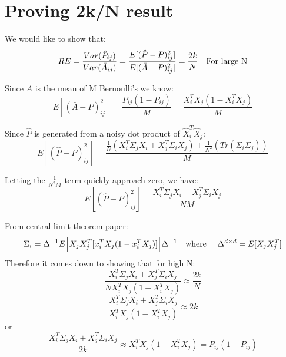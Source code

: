 \documentclass[10pt]{article}
\begin{document}
\section{Proving 2k/N result}
We would like to show that:
\begin{equation*}
 RE = \dfrac{Var(\hat{P}_{ij})}{Var(\bar{A}_{ij})} = \dfrac{E[(\hat{P}-P)^2_{ij}]}{E[(\bar{A}-P)^2_{ij}]}=\dfrac{2k}{N} \mbox{\quad   For large N}
\end{equation*}

Since $\bar{A}$ is the mean of M Bernoulli's we know:
\[
E[(\bar{A}-P)^2_{ij}] = \frac{P_{ij}(1-P_{ij})}{M} = \dfrac{X_i^TX_j(1-X_i^TX_j)}{M}
\]

Since $\hat{P}$ is generated from a noisy dot product of $\hat{X}_i^T\hat{X}_j$:
\[
E[(\hat{P}-P)^2_{ij}] = \dfrac{\frac{1}{N}(X_i^T\Sigma_jX_i + X_j^T\Sigma_iX_j) + \frac{1}{N^2}(Tr(\Sigma_i\Sigma_j))}{M}
\]

Letting the $\frac{1}{N^2M}$ term quickly approach zero, we have:
\[
E[(\hat{P}-P)^2_{ij}] = \dfrac{X_i^T\Sigma_jX_i + X_j^T\Sigma_iX_j}{NM}
\]

From central limit theorem paper:
\[
\Sigma_i = \Delta^{-1}E\Big[X_jX_j^T[x_i^TX_j(1-x_i^TX_j)]\Big]\Delta^{-1} \mbox{\quad where \quad} \Delta^{d \times d} = E[X_jX_j^T]
\]
Therefore it comes down to showing that for high N:
\[
\dfrac{X_i^T\Sigma_jX_i + X_j^T\Sigma_iX_j}{NX_i^TX_j(1-X_i^TX_j)} \approx \dfrac{2k}{N}
\]
\[
\dfrac{X_i^T\Sigma_jX_i + X_j^T\Sigma_iX_j}{X_i^TX_j(1-X_i^TX_j)} \approx 2k
\]
or 
\[
\dfrac{X_i^T\Sigma_jX_i + X_j^T\Sigma_iX_j}{2k} \approx X_i^TX_j(1-X_i^TX_j) = P_{ij}(1-P_{ij})
\]
\end{document}
